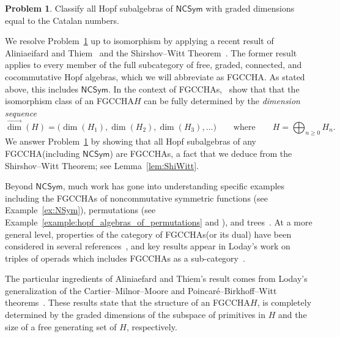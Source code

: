 \documentclass[11pt]{amsart}
\theoremstyle{definition}
\newtheorem{problem}[theorem]{Problem}
\numberwithin{equation}{section}
\newcommand{\FGCCHA}{\textsf{FGCCHA}\xspace}
\newcommand{\FGCCHAs}{\textsf{FGCCHA}s\xspace}
\newcommand{\vecdim}{\overrightarrow{\dim}}
\newcommand{\NCSym}{\mathsf{NCSym}}
\begin{document}
\begin{problem}
\label{problem:motivating_calatan_question}
Classify all Hopf subalgebras of $\NCSym$ with graded dimensions equal to the Catalan numbers.
\end{problem}

%   

We resolve Problem~\ref{problem:motivating_calatan_question} up to isomorphism by applying a recent result of Aliniaeifard and Thiem~\cite{AT22} and the Shirshov--Witt Theorem~\cite{S09, Witt56}.  
The former result applies to every member of the full subcategory of free, graded, connected, and cocommutative Hopf algebras, which we will abbreviate as \FGCCHA.  
As stated above, this includes $\NCSym$.  
In the context of \FGCCHAs,~\cite[Theorem~12]{AT22} show that that the isomorphism class of an
\FGCCHA $H$ can be fully determined by the \emph{dimension sequence}
\[
\vecdim(H) = \big( \dim(H_{1}), \dim(H_{2}), \dim(H_{3}), \ldots \big)
\qquad\text{where}\qquad
H = \bigoplus_{n \ge 0} H_{n}.
\]
We answer Problem~\ref{problem:motivating_calatan_question} by showing that all Hopf subalgebras of any \FGCCHA (including $\NCSym$) are \FGCCHAs, a fact that we deduce from the Shirshov--Witt Theorem; see Lemma~\ref{lem:ShiWitt}.  


Beyond $\NCSym$, much work has gone into understanding specific examples including the \FGCCHAs of noncommutative symmetric functions (see Example~\ref{ex:NSym}), permutations (see Example~\ref{example:hopf_algebras_of_permutations} and \cite{PR02}), and trees~\cite{AS05cc, GL09}.  
At a more general level, properties of the category of \FGCCHAs (or its dual) have been considered in several references~\cite{AT22, Block85, FP24, LodayRonco10, MM65, Reutenauer-FreeLieAlgebras}, and key results appear in Loday's work on triples of operads which includes \FGCCHAs as a sub-category~\cite[Section 4.1]{L08}.  

The particular ingredients of Aliniaefard and Thiem's result comes from Loday's generalization of the  Cartier--Milnor--Moore and Poincar\'{e}--Birkhoff--Witt theorems~\cite[Theorem 4.1.3]{L08}.  These results state that the structure of an \FGCCHA $H$, is completely determined by the graded dimensions of the subspace of primitives in $H$ and the size of a free generating set of $H$, respectively.
\end{document}
